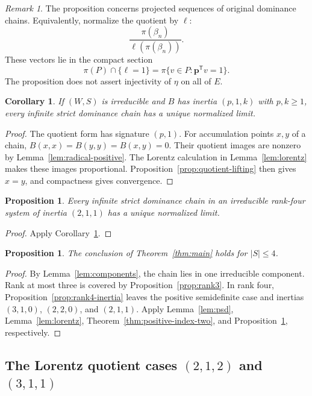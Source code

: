 \documentclass[11pt,reqno]{amsart}
\theoremstyle{plain}
\newtheorem{proposition}[theorem]{Proposition}
\newtheorem{corollary}[theorem]{Corollary}
\theoremstyle{definition}
\theoremstyle{remark}
\newtheorem{remark}[theorem]{Remark}
\numberwithin{equation}{section}
\begin{document}
\begin{remark}
The proposition concerns projected sequences of original dominance chains. Equivalently, normalize the quotient by $\ell$:
\[
\frac{\pi(\beta_n)}{\ell(\pi(\beta_n))}.
\]
These vectors lie in the compact section
\[
\pi(P)\cap\{\ell=1\}=\pi\{v\in P:\mathbf p^{\mathsf T}v=1\}.
\]
The proposition does not assert injectivity of $\eta$ on all of $E$.
\end{remark}

\begin{corollary}\label{cor:lorentz-quotient}
If $(W,S)$ is irreducible and $B$ has inertia $(p,1,k)$ with $p,k\geq1$, every infinite strict dominance chain has a unique normalized limit.
\end{corollary}
\begin{proof}
The quotient form has signature $(p,1)$. For accumulation points $x,y$ of a chain, $B(x,x)=B(y,y)=B(x,y)=0$. Their quotient images are nonzero by Lemma~\ref{lem:radical-positive}. The Lorentz calculation in Lemma~\ref{lem:lorentz} makes these images proportional. Proposition~\ref{prop:quotient-lifting} then gives $x=y$, and compactness gives convergence.
\end{proof}

\begin{proposition}\label{prop:degenerate}
Every infinite strict dominance chain in an irreducible rank-four system of inertia $(2,1,1)$ has a unique normalized limit.
\end{proposition}
\begin{proof}
Apply Corollary~\ref{cor:lorentz-quotient}.
\end{proof}

\begin{proposition}\label{prop:rank-at-most-four}
The conclusion of Theorem~\ref{thm:main} holds for $|S|\leq4$.
\end{proposition}
\begin{proof}
By Lemma~\ref{lem:components}, the chain lies in one irreducible component. Rank at most three is covered by Proposition~\ref{prop:rank3}. In rank four, Proposition~\ref{prop:rank4-inertia} leaves the positive semidefinite case and inertias $(3,1,0)$, $(2,2,0)$, and $(2,1,1)$. Apply Lemma~\ref{lem:psd}, Lemma~\ref{lem:lorentz}, Theorem~\ref{thm:positive-index-two}, and Proposition~\ref{prop:degenerate}, respectively.
\end{proof}

\subsection{The Lorentz quotient cases \texorpdfstring{$(2,1,2)$ and $(3,1,1)$}{(2,1,2) and (3,1,1)}}
\end{document}
